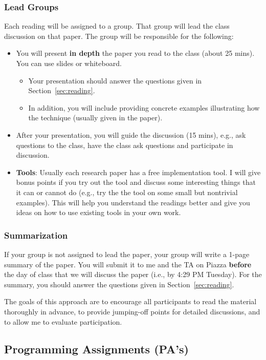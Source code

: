 \documentclass[11pt]{article}
\begin{document}
\subsubsection{Lead Groups} Each reading will be assigned to a group.  That group will lead the class discussion on that paper. The group will be responsible for the following:
\begin{itemize}
\item You will present \textbf{\textbf{in depth}} the paper you read to the class (about 25 mins). You can use slides or whiteboard.
\begin{itemize}
    \item Your presentation should answer the questions given in Section~\ref{sec:reading}.
    \item In addition, you will include providing concrete examples illustrating how the technique (usually given in the paper).
\end{itemize}
\item After your presentation, you will guide the discussion (15 mins), e.g., ask questions to the class, have the class ask questions and participate in discussion.

\item \textbf{\textbf{Tools}}: Usually each research paper has a free implementation
tool. I will give bonus points if you try out the
tool and discuss some interesting things that it can or cannot do
(e.g., try the the tool on some small but nontrivial examples). This
will help you understand the readings better and give you ideas on
how to use existing tools in your own work.
\end{itemize}

\subsubsection{Summarization} 

If your group is not assigned to lead the paper, your group will write a 1-page summary of the paper. You will submit it to me and the TA on Piazza \textbf{before} the day of class that we will discuss the paper (i.e., by 4:29 PM Tuesday).  For the summary, you should answer the questions given in Section~\ref{sec:reading}.

The goals of this approach are to encourage all participants to read the material thoroughly in advance, to provide jumping-off points for detailed discussions, and to allow me to evaluate participation.

\subsection{Programming Assignments (PA's)}
\end{document}
